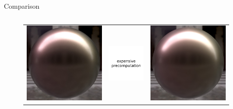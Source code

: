 \documentclass[final]{beamer}
\newlength{\onecolwid}
\newlength{\twocolwid}
\begin{document}
\begin{frame}[t]
\begin{columns}[t]
\begin{column}{\twocolwid}
\begin{block}{Comparison}
\begin{columns}[t,totalwidth=\twocolwid]
\begin{column}{\onecolwid}
\begin{figure}
\begin{tabular}{ccc}
                    	    \includegraphics[width=0.32\columnwidth]{images/validations/compare2/sphere_layered_1024spp_37min.jpg} &
                    	    \includegraphics[width=0.32\columnwidth]{images/validations/compare2/na2.pdf} &
                    	    \includegraphics[width=0.32\columnwidth]{images/validations/compare2/sphere_laurent_1024spp_1_5min.jpg} \\
                    

\end{tabular}
\end{figure}
\end{column}
\end{columns}
\end{block}
\end{column}
\end{columns}
\end{frame}
\end{document}
